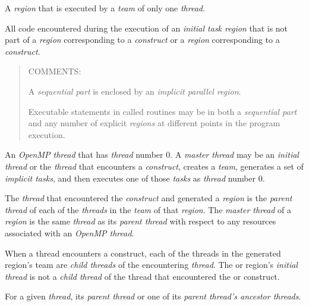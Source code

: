 \smallskip
{}
\glossarydefstart
A  \emph{region} that is executed by a \emph{team} of only one \emph{thread}.
\glossarydefend

\glossarydefstart
All code encountered during the execution of an \emph{initial task region} that is not part
of a  \emph{region} corresponding to a  \emph{construct} or a 
\emph{region} corresponding to a  \emph{construct}.

\begin{quote}
COMMENTS:

A \emph{sequential part} is enclosed by an \emph{implicit parallel region}.

Executable statements in called routines may be in both a \emph{sequential
part} and any number of explicit  \emph{regions} at different points
in the program execution.
\end{quote}
\glossarydefend

\glossarydefstart
An \emph{OpenMP thread} that has  \emph{thread} number 0. A \emph{master
thread} may be an \emph{initial thread} or the \emph{thread} that encounters a
 \emph{construct}, creates a \emph{team}, generates a set of
\emph{implicit tasks}, and then executes one of those \emph{tasks} as
\emph{thread} number 0.
\glossarydefend

\glossarydefstart
The \emph{thread} that encountered the  \emph{construct} and generated a
 \emph{region} is the \emph{parent thread} of each of the
\emph{threads} in the \emph{team} of that
 \emph{region}. The \emph{master thread}
of a  \emph{region} is the same \emph{thread}
as its \emph{parent thread} with respect to any resources associated with an \emph{OpenMP thread}.
\glossarydefend

\glossarydefstart
When a thread encounters a  construct, each of the threads in the
generated  region's team are \emph{child threads} of the encountering \emph{thread}.
The  or  region's \emph{initial thread} is not a \emph{child thread} of the thread
that encountered the  or  construct.
\glossarydefend

\glossarydefstart
For a given \emph{thread}, its \emph{parent thread} or one of its \emph{parent thread's ancestor threads}.
\glossarydefend

